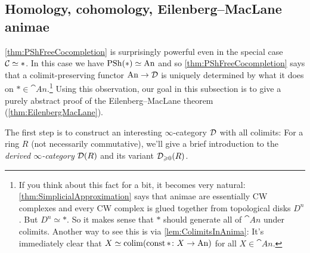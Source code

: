 \subsection{Homology, cohomology, Eilenberg--MacLane animae}\label{subsec:EilenbergMacLane}
\cref{thm:PShFreeCocompletion} is surprisingly powerful even in the special case $\mathcal{C}\simeq *$. In this case we have $\operatorname{PSh}(*)\simeq \mathrm{An}$ and so  \cref{thm:PShFreeCocompletion} says that a colimit-preserving functor $\mathrm{An}\rightarrow\mathcal{D}$ is uniquely determined by what it does on $*\in\cat{An}$.\footnote{If you think about this fact for a bit, it becomes very natural: \cref{thm:SimplicialApproximation} says that animae are essentially CW complexes and every CW complex is glued together from topological disks $D^n$. But $D^n\simeq *$. So it makes sense that $*$ should generate all of $\cat{An}$ under colimits. Another way to see this is via \cref{lem:ColimitsInAnima}: It's immediately clear that $X\simeq \operatorname*{colim}(\operatorname{const}*\colon X\rightarrow\mathrm{An})$ for all $X\in\cat{An}$.} Using this observation, our goal in this subsection is to give a purely abstract proof of the Eilenberg--MacLane theorem (\cref{thm:EilenbergMacLane}).

The first step is to construct an interesting $\infty$-category $\mathcal{D}$ with all colimits: For a ring $R$ (not necessarily commutative), we'll give a brief introduction to the \emph{derived $\infty$-category} $\mathcal{D}(R)$ and its variant $\mathcal{D}_{\geqslant 0}(R)$.

